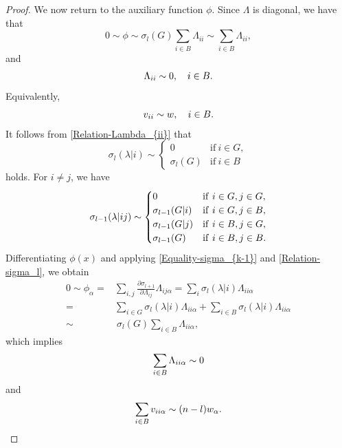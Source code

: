 \documentclass[11pt]{amsart}
\numberwithin{theorem}{section}
\numberwithin{equation}{section}
\begin{document}
\begin{proof}
We now return to the auxiliary function $\phi$. Since $\Lambda$ is diagonal, we have that $$0\sim\phi\sim\sigma_l(G)\sum_{i\in B}\Lambda_{ii}\sim\sum_{i\in B}\Lambda_{ii},$$ and
\begin{equation}\label{Relation-Lambda_{ii}}
\Lambda_{ii}\sim 0,\quad i\in B.
\end{equation}
Equivalently,
\begin{equation}\label{Relation-v_{ii}=w}
v_{ii}\sim w,\quad i\in B.
\end{equation}
It follows from \eqref{Relation-Lambda_{ii}} that
\begin{equation}\label{Relation-sigma_l}
\sigma_l(\lambda|i)\sim\begin{cases}
0 & \mathrm{if}\ i\in G,\\
\sigma_l(G) & \mathrm{if}\ i\in B
\end{cases}
\end{equation}
holds. For $i\neq j$, we have
\begin{equation}\label{Relation-sigma_{l-1}}
\sigma_{l-1}(\lambda|ij)\sim
\begin{cases}
0 & \mathrm{if}\ i\in G, j\in G,\\
\sigma_{l-1}(G|i) & \mathrm{if}\ i\in G, j\in B,\\
\sigma_{l-1}(G|j) & \mathrm{if}\ i\in B, j\in G,\\
\sigma_{l-1}(G) & \mathrm{if}\ i\in B, j\in B.
\end{cases}
\end{equation}
Differentiating $\phi(x)$ and applying \eqref{Equality-sigma_{k-1}} and \eqref{Relation-sigma_l}, we obtain
\begin{align*}
0\sim\phi_\alpha
=&\sum_{i,j}\frac{\partial\sigma_{l+1}}{\partial \Lambda_{ij}}\Lambda_{ij\alpha}=\sum_i\sigma_l(\lambda|i)\Lambda_{ii\alpha}\\
=&\sum_{i\in G}\sigma_l(\lambda|i)\Lambda_{ii\alpha}+\sum_{i\in B}\sigma_l(\lambda|i)\Lambda_{ii\alpha}\\
\sim&~\sigma_l(G)\sum_{i\in B}\Lambda_{ii\alpha},
\end{align*}
which implies
\begin{equation}\label{Relation-Lambda_{iialpha}}
\sum_{i\in B}\Lambda_{ii\alpha}\sim 0
\end{equation}
and
\begin{equation}\label{Relation-v_{iialpha}=(n-l)w_alpha}
\sum_{i\in B}v_{ii\alpha}\sim(n-l)w_\alpha.
\end{equation}


\end{proof}
\end{document}
